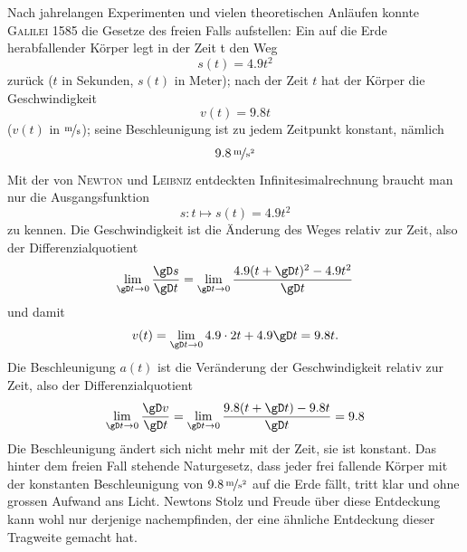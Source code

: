 \documentclass[%
11pt,%
twoside,%
titlepage,%
german,%
headsepline%
]{scrartcl}
\begin{document}
Nach jahrelangen Experimenten und vielen theoretischen Anl\"aufen konnte \textsc{Galilei} 1585 die Gesetze des freien Falls aufstellen: Ein auf die Erde herabfallender K\"orper legt in der Zeit t den Weg
$$s(t)=4.9 t^2$$
zur\"uck ($t$ in Sekunden, $s(t)$ in Meter); nach der Zeit $t$ hat der K\"orper die Geschwindigkeit
$$v(t)=9.8t$$
($v(t)$ in $\unitfrac{m}{s}$); seine Beschleunigung ist zu jedem Zeitpunkt konstant, n\"amlich
$$\unitfrac[9.8]{m}{s^2}$$
Mit der von \textsc{Newton} und \textsc{Leibniz} entdeckten Infinitesimalrechnung braucht man nur die Ausgangsfunktion
$$s:t\mapsto s(t)=4.9t^2$$
zu kennen. Die Geschwindigkeit ist die \"Anderung des Weges relativ zur Zeit, also der Differenzialquotient
$$\lim_{\gD t\to0}\frac{\gD s}{\gD t}=\lim_{\gD t\to0}\frac{4.9(t+\gD t)^2-4.9t^2}{\gD t}$$
und damit
$$v(t)=\lim_{\gD t\to0}4.9\cdot 2t+4.9\gD t=9.8t.$$
Die Beschleunigung $a(t)$ ist die Ver\"anderung der Geschwindigkeit relativ zur Zeit, also der Differenzialquotient
$$\lim_{\gD t\to0}\frac{\gD v}{\gD t}=\lim_{\gD t\to0}\frac{9.8(t+\gD t)-9.8t}{\gD t}=9.8$$
Die Beschleunigung \"andert sich nicht mehr mit der Zeit, sie ist konstant. Das hinter dem freien Fall stehende Naturgesetz, dass jeder frei fallende K\"orper mit der konstanten Beschleunigung von $\unitfrac[9.8]{m}{s^2}$ auf die Erde f\"allt, tritt klar und ohne grossen Aufwand ans Licht. Newtons Stolz und Freude \"uber diese Entdeckung kann wohl nur derjenige nachempfinden, der eine \"ahnliche Entdeckung dieser Tragweite gemacht hat.
\end{document}
